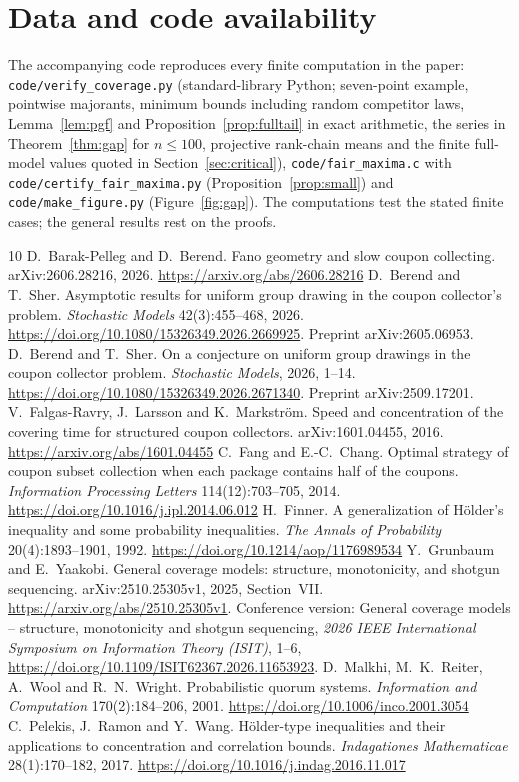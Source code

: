 \documentclass[11pt,a4paper]{article}
\theoremstyle{remark}
\begin{document}
\section*{Data and code availability}
The accompanying code reproduces every finite computation in the paper: \nolinkurl{code/verify_coverage.py} (standard-library Python; seven-point example, pointwise majorants, minimum bounds including random competitor laws, Lemma~\ref{lem:pgf} and Proposition~\ref{prop:fulltail} in exact arithmetic, the series in Theorem~\ref{thm:gap} for $n\le100$, projective rank-chain means and the finite full-model values quoted in Section~\ref{sec:critical}), \nolinkurl{code/fair_maxima.c} with \nolinkurl{code/certify_fair_maxima.py} (Proposition~\ref{prop:small}) and \nolinkurl{code/make_figure.py} (Figure~\ref{fig:gap}). The computations test the stated finite cases; the general results rest on the proofs.

\begin{thebibliography}{10}
 D.~Barak-Pelleg and D.~Berend. Fano geometry and slow coupon collecting. arXiv:2606.28216, 2026. \url{https://arxiv.org/abs/2606.28216}
 D.~Berend and T.~Sher. Asymptotic results for uniform group drawing in the coupon collector's problem. \emph{Stochastic Models} 42(3):455--468, 2026. \url{https://doi.org/10.1080/15326349.2026.2669925}. Preprint arXiv:2605.06953.
 D.~Berend and T.~Sher. On a conjecture on uniform group drawings in the coupon collector problem. \emph{Stochastic Models}, 2026, 1--14. \url{https://doi.org/10.1080/15326349.2026.2671340}. Preprint arXiv:2509.17201.
 V.~Falgas-Ravry, J.~Larsson and K.~Markstr\"om. Speed and concentration of the covering time for structured coupon collectors. arXiv:1601.04455, 2016. \url{https://arxiv.org/abs/1601.04455}
 C.~Fang and E.-C.~Chang. Optimal strategy of coupon subset collection when each package contains half of the coupons. \emph{Information Processing Letters} 114(12):703--705, 2014. \url{https://doi.org/10.1016/j.ipl.2014.06.012}
 H.~Finner. A generalization of H\"older's inequality and some probability inequalities. \emph{The Annals of Probability} 20(4):1893--1901, 1992. \url{https://doi.org/10.1214/aop/1176989534}
 Y.~Grunbaum and E.~Yaakobi. General coverage models: structure, monotonicity, and shotgun sequencing. arXiv:2510.25305v1, 2025, Section~VII. \url{https://arxiv.org/abs/2510.25305v1}. Conference version: General coverage models -- structure, monotonicity and shotgun sequencing, \emph{2026 IEEE International Symposium on Information Theory (ISIT)}, 1--6, \url{https://doi.org/10.1109/ISIT62367.2026.11653923}.
 D.~Malkhi, M.~K.~Reiter, A.~Wool and R.~N.~Wright. Probabilistic quorum systems. \emph{Information and Computation} 170(2):184--206, 2001. \url{https://doi.org/10.1006/inco.2001.3054}
 C.~Pelekis, J.~Ramon and Y.~Wang. H\"older-type inequalities and their applications to concentration and correlation bounds. \emph{Indagationes Mathematicae} 28(1):170--182, 2017. \url{https://doi.org/10.1016/j.indag.2016.11.017}
\end{thebibliography}
\end{document}
